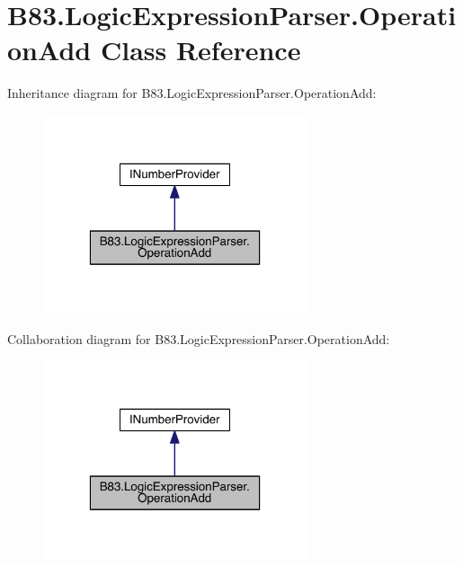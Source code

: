 \hypertarget{class_b83_1_1_logic_expression_parser_1_1_operation_add}{}\section{B83.\+Logic\+Expression\+Parser.\+Operation\+Add Class Reference}
\label{class_b83_1_1_logic_expression_parser_1_1_operation_add}


Inheritance diagram for B83.\+Logic\+Expression\+Parser.\+Operation\+Add\+:\nopagebreak
\begin{figure}[H]
\begin{center}
\leavevmode
\includegraphics[width=220pt]{class_b83_1_1_logic_expression_parser_1_1_operation_add__inherit__graph}
\end{center}
\end{figure}


Collaboration diagram for B83.\+Logic\+Expression\+Parser.\+Operation\+Add\+:\nopagebreak
\begin{figure}[H]
\begin{center}
\leavevmode
\includegraphics[width=220pt]{class_b83_1_1_logic_expression_parser_1_1_operation_add__coll__graph}
\end{center}
\end{figure}
